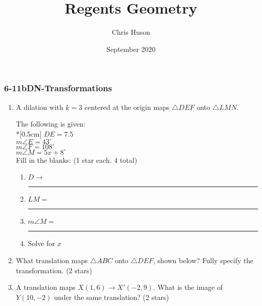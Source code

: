 \documentclass[12pt, twoside]{article}
\title{Regents Geometry}
\author{Chris Huson}
\date{September 2020}
\begin{document}
\subsubsection*{6-11bDN-Transformations}
\begin{enumerate}
\item A dilation with $k=3$ centered at the origin maps $\triangle DEF$ onto $\triangle LMN$. \vspace{0.5cm}
  \begin{multicols}{2}
      The following is given:\\*[0.5cm]
      $DE=7.5$ \\
      $m\angle E = 43^\circ$ \\
      $m\angle F = 108^\circ$ \\
      $m\angle M = 5x + 8^\circ$ \\
      Fill in the blanks: \hfill (1 star each. 4 total)
      \begin{enumerate}
        \item $D \rightarrow$ \rule{2cm}{0.15mm}
        \item $LM =$ \rule{2cm}{0.15mm}
        \item $m\angle M =$ \rule{2cm}{0.15mm}
        \item Solve for $x$
      \end{enumerate}
    \end{multicols}  \vspace{3cm}

\item What translation maps $\triangle ABC$ onto $\triangle DEF$, shown below? Fully specify the transformation.  \hfill (2 stars)\\[0.25cm]


\item A translation maps $X(1,6) \rightarrow X'(-2,9)$. What is the image of $Y(10,-2)$ under the same translation? \hfill (2 stars)


\end{enumerate}
\end{document}
